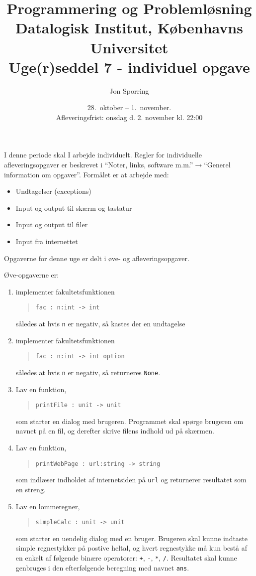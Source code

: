 \documentclass[a4paper,12pt]{article}
\title{Programmering og Problemløsning\\Datalogisk Institut,
  Københavns Universitet\\Uge(r)seddel 7 - individuel opgave}
\author{Jon Sporring}
\date{28.\ oktober -- 1.\ november.\\Afleveringsfrist: onsdag d. 2. november kl. 22:00}
\begin{document}
\maketitle

I denne periode skal I arbejde individuelt. Regler for individuelle afleveringsopgaver er beskrevet i "`Noter, links, software m.m."'$\rightarrow$"`Generel information om opgaver"'. Formålet er at arbejde med:
\begin{itemize}
\item Undtagelser (exceptions)
\item Input og output til skærm og tastatur
\item Input og output til filer
\item Input fra internettet
\end{itemize}

Opgaverne for denne uge er delt i øve- og afleveringsopgaver. 

Øve-opgaverne er:
\begin{enumerate}[label=8ø.\arabic*,start=0]
\item implementer fakultetsfunktionen
  \begin{quote}
    \mbox{\lstinline!fac : n:int -> int!}
  \end{quote}
  således at hvis \lstinline!n! er negativ, så kastes der en undtagelse
\item implementer fakultetsfunktionen
  \begin{quote}
    \mbox{\lstinline!fac : n:int -> int option!}
  \end{quote}
  således at hvis \lstinline!n! er negativ, så returneres \lstinline!None!.
\item Lav en funktion,
  \begin{quote}
    \mbox{\lstinline!printFile : unit -> unit!}
  \end{quote}
  som starter en dialog med brugeren. Programmet skal spørge brugeren om navnet på en fil, og derefter skrive filens indhold ud på skærmen.
\item Lav en funktion, 
  \begin{quote}
    \mbox{\lstinline!printWebPage : url:string -> string!}
  \end{quote}
  som indlæser indholdet af internetsiden på \lstinline!url! og returnerer resultatet som en streng.
\item Lav en lommeregner,
  \begin{quote}
    \mbox{\lstinline!simpleCalc : unit -> unit!}
  \end{quote}
  som starter en uendelig dialog med en bruger. Brugeren skal kunne indtaste simple regnestykker på postive heltal, og hvert regnestykke må kun bestå af en enkelt af følgende binære operatorer: \lstinline!+!, \lstinline!-!, \lstinline!*!, \lstinline!/!. Resultatet skal kunne genbruges i den efterfølgende beregning med navnet \lstinline!ans!.
\end{enumerate}
\end{document}
